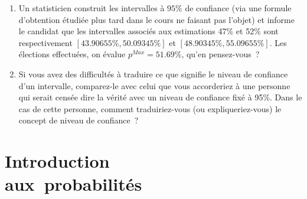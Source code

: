 \documentclass[10pt]{report}
\begin{document}
\begin{exercice}
\begin{enumerate}
\item Un statisticien construit les intervalles à $95\%$ de confiance (via une formule d'obtention étudiée plus tard dans le cours ne faisant pas l'objet) et informe le candidat que les intervalles associés aux estimations 47\% et 52\% sont respectivement $[43.90655\%,50.09345\%]$ et $[48.90345\%,55.09655\%]$. Les élections effectuées, on évalue $p^{Max}=51.69\%$, qu'en pensez-vous~?


\item Si vous avez des difficultés à traduire ce que signifie le niveau de confiance d'un intervalle, comparez-le avec celui que vous accorderiez à une personne qui serait censée dire la vérité avec un niveau de confiance fixé à 95\%. Dans le cas de cette personne, comment traduiriez-vous (ou expliqueriez-vous) le concept de niveau de confiance~? \\

\end{enumerate}

\end{exercice}
\chapter{Introduction\\ aux~probabilités}\label{TdProb}
\end{document}
